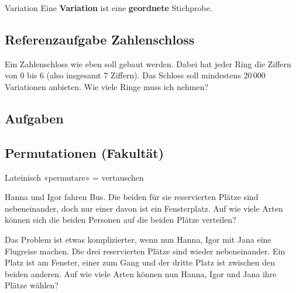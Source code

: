 \begin{definition}{Variation}{}
Eine \textbf{Variation} ist eine \textbf{geordnete} Stichprobe.
\end{definition}
\newpage

\subsection*{Referenzaufgabe Zahlenschloss}
Ein Zahlenschloss wie eben soll gebaut werden. Dabei hat jeder Ring
die Ziffern von 0 bis 6 (also insgesamt 7 Ziffern).
Das Schloss soll mindestens 20\,000 Variationen anbieten. Wie viele
Ringe muss ich nehmen?



\subsection*{Aufgaben}
\newpage


\subsection{Permutationen (Fakultät)}
Lateinisch «permutare» = vertauschen

Hanna und Igor fahren Bus. Die beiden für sie reservierten Plätze sind
nebeneinander, doch nur einer davon ist ein Fensterplatz. Auf wie
viele Arten können sich die beiden Personen auf die beiden Plätze
verteilen?


Das Problem ist etwas komplizierter, wenn nun Hanna, Igor mit Jana
eine Flugreise machen. Die drei reservierten Plätze sind wieder
nebeneinander. Ein Platz ist am Fenster, einer zum Gang und der dritte
Platz ist zwischen den beiden anderen. Auf wie viele Arten können nun
Hanna, Igor und Jana ihre Plätze wählen?


